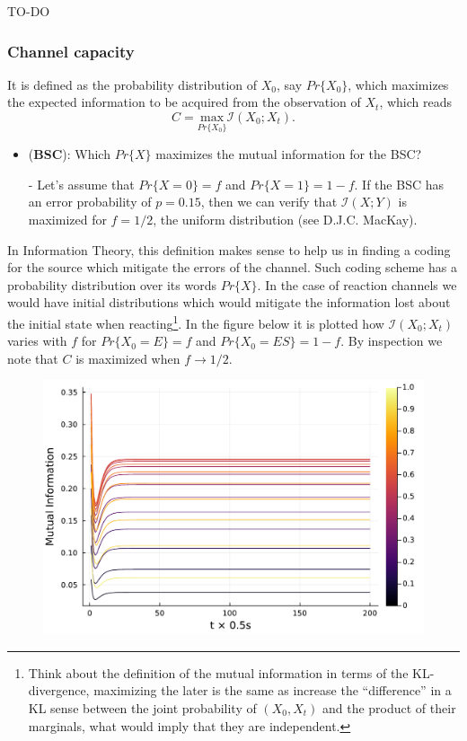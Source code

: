\documentclass[11pt]{amsart}
\begin{document}
TO-DO

\subsubsection{Channel capacity}
It is defined as the probability distribution of $X_0$, say $Pr\{X_0\}$, which maximizes the expected information to be acquired from the observation of $X_t$, which reads
$$C = \underset{Pr\{X_0\}}{\text{max}} \mathcal{I}(X_0;X_t).$$

\begin{itemize}
\item ({\bf BSC}): Which $Pr\{X\}$ maximizes the mutual information for the BSC?
\item[-] Let's assume that $Pr\{X = 0\} = f$ and $Pr\{X = 1\} = 1-f$. If the BSC has an error probability of $p=0.15$, then we can verify that $\mathcal{I}(X;Y)$ is maximized for $f=1/2$, the uniform distribution (see D.J.C. MacKay).

\end{itemize}


In Information Theory, this definition makes sense to help us in finding a coding for the source which mitigate the errors of the channel. Such coding scheme has a probability distribution over its words $Pr\{X\}$. In the case of reaction channels we would have initial distributions which would mitigate the information lost about the initial state when reacting\footnote{Think about the definition of the mutual information in terms of the KL-divergence, maximizing the later is the same as increase the ``difference'' in a KL sense between the joint probability of $(X_0,X_t)$ and the product of their marginals, what would imply that they are independent.}. In the figure below it is plotted how $\mathcal{I}(X_0;X_t)$ varies with $f$ for $Pr\{X_0 = E\} = f$ and $Pr\{X_0 = ES\} = 1-f$. By inspection we note that $C$ is maximized when $f \rightarrow 1/2$.

\begin{figure}[h]
\includegraphics[scale=.5]{I_mutual}
\end{figure}
\end{document}
